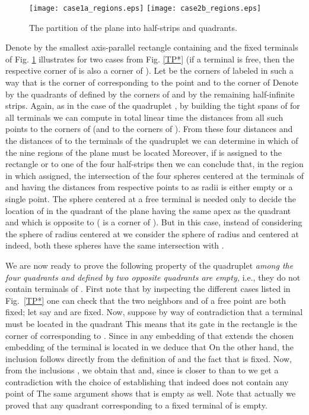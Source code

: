 \documentclass[11pt]{amsart}
\begin{document}
\begin{figure}
\begin{center}
\texttt{[image: case1a\_regions.eps]}
\hspace*{2cm}
\texttt{[image: case2b\_regions.eps]}
\end{center}
\caption{The partition of the plane into half-strips and quadrants.}
\label{regions}
\end{figure}


 Denote by  the smallest axis-parallel rectangle containing  and the fixed terminals
 of  Fig. \ref{regions} illustrates  for two cases from Fig. \ref{TP*}
 (if a terminal is free, then the respective corner of  is also a corner of
 ). Let  be the corners of  labeled in such a way that  is the corner of
 corresponding to the point  and to the corner 
of  Denote by  the quadrants of
 defined by
 the corners of  and by  the remaining half-infinite strips.
 Again, as in the case of the quadruplet , by building the tight spans
 of  for all terminals  we can compute in total
 linear time the distances from all such points  to the corners of  (and to
 the corners of ). From these four distances and the distances of  to the
 terminals of the quadruplet  we can determine in which of the nine regions
  of the plane must be located 
 Moreover, if  is assigned to the rectangle  or to one of the four
 half-strips  then we can conclude that, in the region 
 in which  assigned, the intersection
 of the four spheres centered at the terminals of  and having the distances
 from respective points to  as radii is either empty or a single point. The
 sphere centered at a free terminal  is needed only to decide the location of
  in the quadrant  of the plane having the same apex  as the quadrant 
 and which is opposite to   ( is a corner of ). But in this case,
 instead of considering the sphere of radius  centered at 
 we consider the sphere of radius  and centered
 at  indeed, both these spheres have the same intersection with .





We are now ready to prove the following property of the quadruplet  {\it among the four quadrants
 and  defined by  two opposite quadrants are empty,} i.e., they do not contain terminals
of . First note that by inspecting the different cases listed in Fig.~\ref{TP*} one can check that the
two neighbors  and  of a free point  are both
fixed; let say  and  are fixed. Now, suppose by way of contradiction that a terminal  must be located
in the quadrant  This means that its gate in the rectangle  is the corner of  corresponding to . Since in any embedding  of 
that extends the chosen embedding of  the terminal  is located in  we deduce that  
On the other hand, the inclusion  follows directly from the definition of  and the fact
that  is fixed. Now, from the inclusions , we obtain that  and,
since  is closer to  than to  we get a contradiction with the choice of 
establishing that indeed  does not contain any point of  The same argument
shows that  is empty as well. Note that actually we proved that any quadrant  corresponding to a
fixed terminal  of  is empty.
\end{document}
